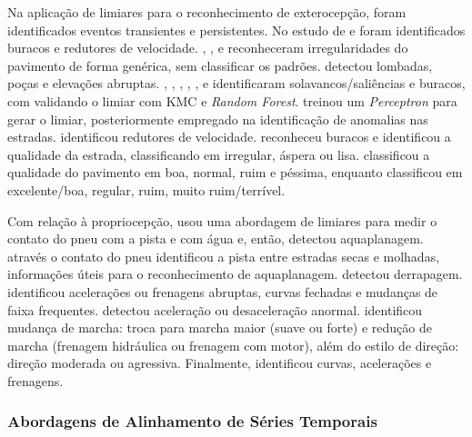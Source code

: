 Na aplicação de limiares para o reconhecimento de exterocepção, foram identificados eventos transientes e persistentes. No estudo de \cite{Orhan2013} e \cite{Strutu2013} foram identificados buracos e redutores de velocidade. \cite{Akhtar2014}, \cite{Astarita2014}, \cite{Kaur2017} e \cite{Vittorio2014} reconheceram irregularidades do pavimento de forma genérica, sem classificar os padrões. \cite{Jamakhandi2014} detectou lombadas, poças e elevações abruptas. \cite{BelloSalau2018}, \cite{Gunawan2015}, \cite{Ghadge2015}, \cite{Kumar2017}, \cite{Li2018}, \cite{Pooja2017} e \cite{Rishiwal2016} identificaram solavancos/saliências e buracos, com \cite{Ghadge2015} validando o limiar com KMC e \textit{Random Forest}. \cite{Gawad2016} treinou um \textit{Perceptron} para gerar o limiar, posteriormente empregado na identificação de anomalias nas estradas. \cite{Afrin2015} identificou redutores de velocidade. \cite{Hsu2016} reconheceu buracos e identificou a qualidade da estrada, classificando em irregular, áspera ou lisa. \cite{Lima2016} classificou a qualidade do pavimento em boa, normal, ruim e péssima, enquanto \cite{Li2018} classificou em excelente/boa, regular, ruim, muito ruim/terrível.

Com relação à propriocepção, \cite{Niskanen2015} usou uma abordagem de limiares para medir o contato do pneu com a pista e com água e, então, detectou aquaplanagem. \cite{Matilainen2015} através o contato do pneu identificou a pista entre estradas secas e molhadas, informações úteis para o reconhecimento de aquaplanagem. \cite{Hou2017} detectou derrapagem. \cite{Sharma2015} identificou acelerações ou frenagens abruptas, curvas fechadas e mudanças de faixa frequentes. \cite{Li2016} detectou aceleração ou desaceleração anormal. \cite{Andria2016} identificou mudança de marcha: troca para marcha maior (suave ou forte) e redução de marcha (frenagem hidráulica ou frenagem com motor), além do estilo de direção: direção moderada ou agressiva. Finalmente, \cite{Gavruta2018} identificou curvas, acelerações e frenagens. 

\subsubsection{Abordagens de Alinhamento de Séries Temporais} 

